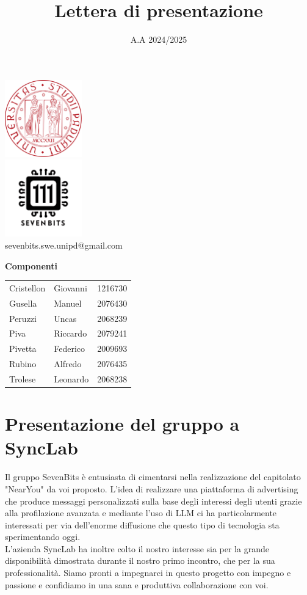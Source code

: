 \documentclass[10pt]{article}
\title{Lettera di presentazione}
\date{A.A 2024/2025}
\begin{document}
\maketitle
\begin{center}
\includegraphics[width=0.25\textwidth]{LogoUnipd}\\
\includegraphics[width=0.25\textwidth]{Sevenbitslogo}\\
sevenbits.swe.unipd@gmail.com\\
\vspace{2cm}

\textbf{Componenti}\\
\vspace{2mm}
\begin{tabular}{l l l}
Cristellon & Giovanni & 1216730\\
Gusella & Manuel & 2076430\\
Peruzzi & Uncas & 2068239\\
Piva & Riccardo & 2079241\\
Pivetta & Federico & 2009693\\
Rubino & Alfredo & 2076435\\
Trolese & Leonardo & 2068238\\ 
\end{tabular}
\end{center}

\newpage
\section{Presentazione del gruppo a SyncLab}
Il gruppo SevenBits è entusiasta di cimentarsi nella realizzazione del capitolato "NearYou" da voi proposto. L'idea di realizzare una piattaforma di advertising
che produce messaggi personalizzati sulla base degli interessi degli utenti grazie alla profilazione avanzata e mediante l'uso di LLM ci ha particolarmente
interessati per via dell'enorme diffusione che questo tipo di tecnologia sta sperimentando oggi. \\
L'azienda SyncLab ha inoltre colto il nostro interesse sia per la grande disponibilità dimostrata durante il nostro primo incontro, che per la sua professionalità.
Siamo pronti a impegnarci in questo progetto con impegno e passione e confidiamo in una sana e produttiva collaborazione con voi.
\end{document}
